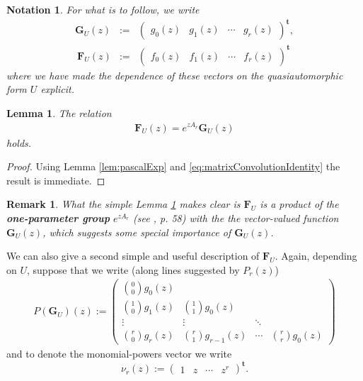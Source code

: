 \documentclass[11pt]{article}
\newtheorem{rmk}{Remark}
\newtheorem{lem}{Lemma}
\newtheorem{notn}{Notation}
\begin{document}
    \begin{notn}
        For what is to follow, we write
            \begin{eqnarray*}
                \mathbf{G}_U(z) &:=& 
                    \begin{pmatrix}
                        g_0(z) & g_1(z) & \cdots & g_r(z)
                    \end{pmatrix}^{\mathbf{t}},\\
        \       \mathbf{F}_U(z) &:=& 
                    \begin{pmatrix}
                        f_0(z) & f_1(z) & \cdots & f_r(z)
                    \end{pmatrix}^{\mathbf{t}}
            \end{eqnarray*}
        where we have made the dependence of these vectors on the quasiautomorphic form $ U $ explicit. 
    \end{notn}


    \begin{lem}\label{lem:expForm}
        The relation 
            \begin{eqnarray*}
                \mathbf{F}_U(z) = e^{z A_r} \mathbf{G}_U(z)
            \end{eqnarray*}
        holds. 
    \end{lem}
    \begin{proof}
        Using Lemma \ref{lem:pascalExp} and \eqref{eq:matrixConvolutionIdentity} the result is immediate. 
    \end{proof}

    \begin{rmk}
        What the simple Lemma \ref{lem:expForm} makes clear is $ \mathbf{F}_U $ is a product of the \textbf{one-parameter group} $ e^{z A_r} $ (see \cite{Baker2002}, p. 58) with the the vector-valued function $ \mathbf{G}_U(z) $, which suggests some special importance of $ \mathbf{G}_U(z) $. 
    \end{rmk}


We can also give a second simple and useful description of $ \mathbf{F}_U $. Again, depending on $ U $, suppose that we write (along lines suggested by $ P_r(z) $)
    \begin{eqnarray}\label{eq:transferMatrix}
        P(\mathbf{G}_U)(z) :=
            \begin{pmatrix}
                \binom{0}{0}g_0(z) \\
                \binom{1}{0} g_1(z) & \binom{1}{1}g_0(z) \\
                \vdots & \vdots & \ddots \\
                \binom{r}{0}g_r(z) & \binom{r}{1}g_{r-1}(z) & \cdots & \binom{r}{r}g_{0}(z)  
            \end{pmatrix}  
    \end{eqnarray}
and to denote the monomial-powers vector we write 
    \begin{equation*}
        \nu_r(z) := 
        \begin{pmatrix}
            1 & z & \cdots & z^r 
        \end{pmatrix}^\mathbf{t}.
    \end{equation*}
\end{document}
